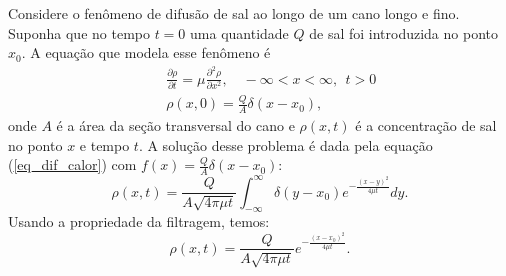\begin{ex}{\label{ex_eq_dif_2}}
Considere o fenômeno de difusão de sal ao longo de um cano longo e fino. Suponha que no tempo $t=0$ uma quantidade $Q$ de sal foi introduzida no ponto $x_0$. A equação que modela esse fenômeno é
\begin{eqnarray*}
&&\frac{\partial \rho}{\partial t}=\mu \frac{\partial^2
\rho}{\partial x^2},\quad -\infty<x<\infty,\ \ t>0\\
&&\rho(x,0)=\frac{Q}{A}\delta(x-x_0),
\end{eqnarray*}
onde $A$ é a área da seção transversal do cano e $\rho(x,t)$ é a concentração de sal no ponto $x$ e tempo $t$. A solução desse problema é dada pela equação (\ref{eq_dif_calor}) com $f(x)=\frac{Q}{A}\delta(x-x_0)$:
\begin{equation*}
\rho(x,t)=\frac{Q}{A\sqrt{4\pi \mu t}}\int_{-\infty}^\infty
\delta(y-x_0)e^{-\frac{(x-y)^2}{4\mu t}}dy.
\end{equation*}
Usando a propriedade da filtragem, temos:
\begin{equation*}
\rho(x,t)=\frac{Q}{A\sqrt{4\pi \mu t}}e^{-\frac{(x-x_0)^2}{4\mu t}}.
\end{equation*}
\end{ex}
